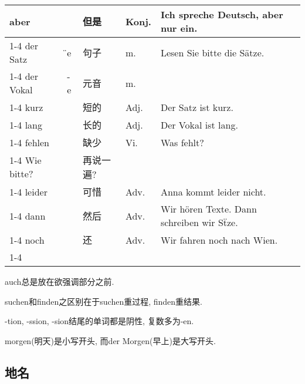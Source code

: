 \documentclass[hidelinks]{ctexart}
\newcommand{\gvocabcline}{\cline{1-4}}
\begin{document}
\begin{longtable}{lllll}
    aber & & 但是 & Konj. & Ich spreche Deutsch, aber nur ein. \\
    \gvocabcline
    der Satz & \"{}e & 句子 & m. & Lesen Sie bitte die S\"atze. \\
    \gvocabcline
    der Vokal & -e & 元音 & m. \\
    \gvocabcline
    kurz & & 短的 & Adj. & Der Satz ist kurz. \\
    \gvocabcline
    lang & & 长的 & Adj. & Der Vokal ist lang. \\
    \gvocabcline
    fehlen & & 缺少 & Vi. & Was fehlt? \\
    \gvocabcline
    Wie bitte? & & 再说一遍? & \\
    \gvocabcline
    leider & & 可惜 & Adv. & Anna kommt leider nicht. \\
    \gvocabcline
    dann & & 然后 & Adv. & Wir h\"oren Texte. Dann schreiben wir S\"tze. \\
    \gvocabcline
    noch & & 还 & Adv. & Wir fahren noch nach Wien. \\
    \gvocabcline
\end{longtable}

\begin{finale}
    auch总是放在欲强调部分之前.
\end{finale}
\begin{finale}
    suchen和finden之区别在于suchen重过程, finden重结果.
\end{finale}
\begin{finale}
    -tion, -ssion, -sion结尾的单词都是阴性, 复数多为-en.
\end{finale}
\begin{pitfall}
    morgen(明天)是小写开头, 而der Morgen(早上)是大写开头.
\end{pitfall}

\subsection*{地名}
\end{document}
